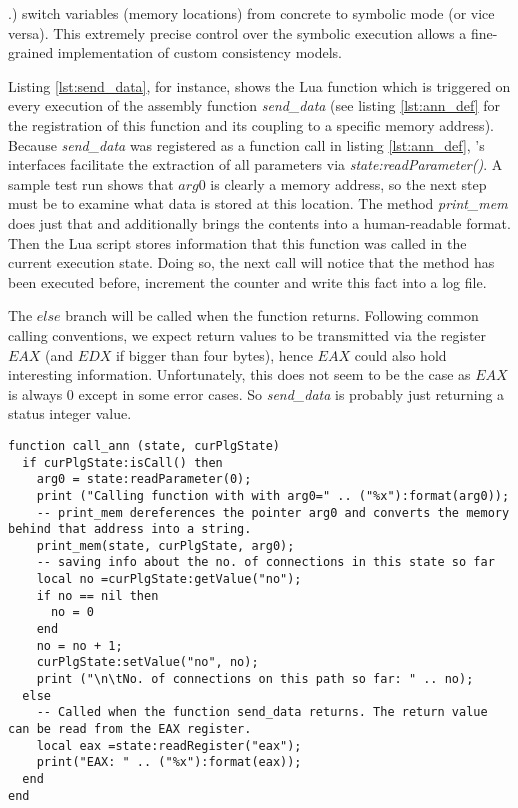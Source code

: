.) switch variables (memory locations) from concrete to symbolic mode (or vice versa).
This extremely precise control over the symbolic execution allows a fine-grained implementation of custom consistency models.

\bigskip

Listing \ref{lst:send_data}, for instance, shows the Lua function which is triggered on every execution of the assembly function \textit{send\_data} (see listing \ref{lst:ann_def} for the registration of this function and its coupling to a specific memory address).
Because \textit{send\_data} was registered as a function call in listing \ref{lst:ann_def}, \sse's interfaces facilitate the extraction of all parameters via \textit{state:readParameter()}.
A sample test run shows that $arg0$ is clearly a memory address, so the next step must be to examine what data is stored at this location.
The method \textit{print\_mem} does just that and additionally brings the contents into a human-readable format.
Then the Lua script stores information that this function was called in the current execution state.
Doing so, the next call will notice that the method has been executed before, increment the counter and write this fact into a log file.

The $else$ branch will be called when the function returns.
Following common calling conventions, we expect return values to be transmitted via the register $EAX$ (and $EDX$ if bigger than four bytes), hence $EAX$ could also hold interesting information.
Unfortunately, this does not seem to be the case as $EAX$ is always $0$ except in some error cases.
So \textit{send\_data} is probably just returning a status integer value.







\bigskip
\begin{lstlisting}[language={[5.0]Lua}, basicstyle=\ttfamily\footnotesize, caption={Lua function executed upon every call of the function send\_data(). See lines 18 - 24 in listing \ref{lst:ann_def} for the registration of \textit{call\_ann}.}, label={lst:send_data}]
function call_ann (state, curPlgState)
  if curPlgState:isCall() then
    arg0 = state:readParameter(0);
    print ("Calling function with with arg0=" .. ("%x"):format(arg0));
    -- print_mem dereferences the pointer arg0 and converts the memory behind that address into a string.
    print_mem(state, curPlgState, arg0);
    -- saving info about the no. of connections in this state so far
    local no =curPlgState:getValue("no");
    if no == nil then
      no = 0
    end
    no = no + 1;
    curPlgState:setValue("no", no);
    print ("\n\tNo. of connections on this path so far: " .. no);
  else
    -- Called when the function send_data returns. The return value can be read from the EAX register.
    local eax =state:readRegister("eax");
    print("EAX: " .. ("%x"):format(eax));
  end
end
\end{lstlisting}
\bigskip

